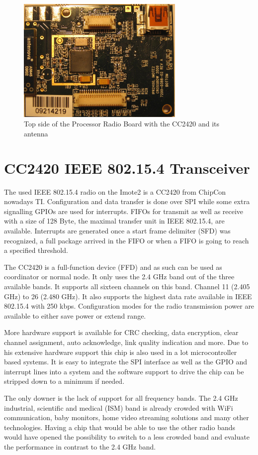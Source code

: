 \begin{figure}
  \begin{center}
    \includegraphics[height=6cm]{images/imote_top_cutted}
    \caption{Top side of the Processor Radio Board with the CC2420 and its antenna}
        \label{fig:imote2top}
  \end{center}
\end{figure}

\section{CC2420 IEEE 802.15.4 Transceiver}
\label{cc2420}
The used IEEE 802.15.4 radio on the Imote2 is a CC2420 from ChipCon nowadays TI.
Configuration and data transfer is done over SPI while some extra signalling
GPIOs are used for interrupts. FIFOs for transmit as well as receive with a size
of 128 Byte, the maximal transfer unit in IEEE 802.15.4, are available. Interrupts
are generated once a start frame delimiter (SFD) was recognized, a full package
arrived in the FIFO or when a FIFO is going to reach a specified threshold.

The CC2420 is a full-function device (FFD) and as such can be used as
coordinator or normal node. It only uses the 2.4 GHz band out of the three
available bands. It supports all sixteen channels on this band. Channel 11
(2.405 GHz) to 26 (2.480 GHz). It also supports the highest data rate available
in IEEE 802.15.4 with 250 kbps. Configuration modes for the radio transmission power
are available to either save power or extend range.

More hardware support is available for CRC checking, data encryption, clear
channel assignment, auto acknowledge, link quality indication and more. Due to
his extensive hardware support this chip is also used in a lot microcontroller
based systems. It is easy to integrate the SPI interface as well as the GPIO and
interrupt lines into a system and the software support to drive the chip can be
stripped down to a minimum if needed.

The only downer is the lack of support for all frequency bands. The 2.4 GHz
industrial, scientific and medical (ISM) band is already crowded with WiFi
communication, baby monitors, home video streaming solutions and many other
technologies. Having a chip that would be able to use the other radio bands
would have opened the possibility to switch to a less crowded band and evaluate
the performance in contrast to the 2.4 GHz band.
